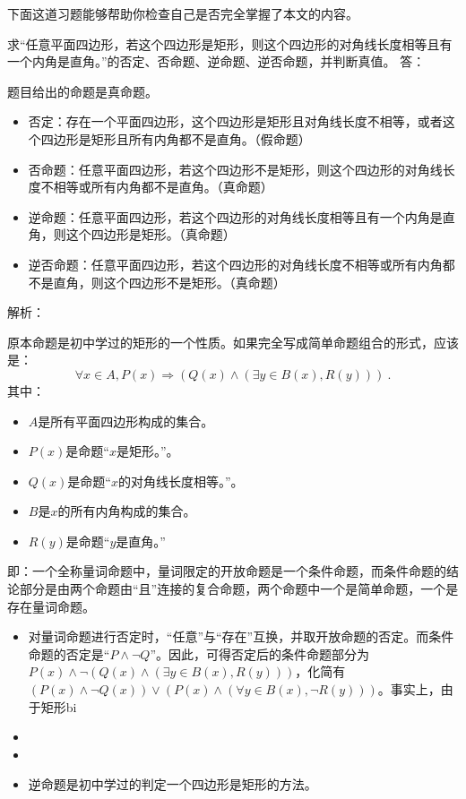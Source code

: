 下面这道习题能够帮助你检查自己是否完全掌握了本文的内容。
\begin{exercise}{求“任意平面四边形，若这个四边形是矩形，则这个四边形的对角线长度相等且有一个内角是直角。”的否定、否命题、逆命题、逆否命题，并判断真值。}
答：

题目给出的命题是真命题。
\begin{itemize}
\item 否定：存在一个平面四边形，这个四边形是矩形且对角线长度不相等，或者这个四边形是矩形且所有内角都不是直角。（假命题）
\item 否命题：任意平面四边形，若这个四边形不是矩形，则这个四边形的对角线长度不相等或所有内角都不是直角。（真命题）
\item 逆命题：任意平面四边形，若这个四边形的对角线长度相等且有一个内角是直角，则这个四边形是矩形。（真命题）
\item 逆否命题：任意平面四边形，若这个四边形的对角线长度不相等或所有内角都不是直角，则这个四边形不是矩形。（真命题）
\end{itemize}

解析：

原本命题是初中学过的矩形的一个性质。如果完全写成简单命题组合的形式，应该是：
$$\forall x\in A,P(x)\Rightarrow (Q(x)\land (\exists y\in B(x),R(y)))~.$$
其中：
\begin{itemize}
\item $A$是所有平面四边形构成的集合。
\item $P(x)$是命题“$x$是矩形。”。
\item $Q(x)$是命题“$x$的对角线长度相等。”。
\item $B$是$x$的所有内角构成的集合。
\item $R(y)$是命题“$y$是直角。”
\end{itemize}
即：一个全称量词命题中，量词限定的开放命题是一个条件命题，而条件命题的结论部分是由两个命题由“且”连接的复合命题，两个命题中一个是简单命题，一个是存在量词命题。
\begin{itemize}
\item 对量词命题进行否定时，“任意”与“存在”互换，并取开放命题的否定。而条件命题的否定是“$P\land\lnot Q$”。因此，可得否定后的条件命题部分为$P(x)\land\lnot(Q(x)\land (\exists y\in B(x),R(y)))$，化简有$(P(x)\land\lnot Q(x))\lor(P(x)\land(\forall y\in B(x),\lnot R(y)))$。事实上，由于矩形bi
\item 
\item 
\item 逆命题是初中学过的判定一个四边形是矩形的方法。
\end{itemize}
\end{exercise}
